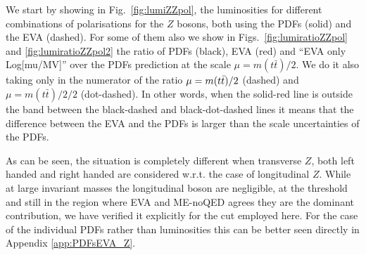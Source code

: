 \documentclass[a4paper,11pt]{article}
\begin{document}
We start by showing in Fig.~\ref{fig:lumiZZpol}, the luminosities for different combinations of polarisations for the $Z$ bosons, both using the PDFs (solid) and the EVA (dashed). For some of them also we show in Figs.~\ref{fig:lumiratioZZpol} and \ref{fig:lumiratioZZpol2} the ratio of PDFs (black), EVA (red) and ``EVA only Log[mu/MV]'' over the PDFs prediction at the scale $\mu=m(t \bar t) /2$. We do it also taking only in the numerator of the ratio  $\mu=m(t \bar t) /2 \time 2$ (dashed) and $\mu=m(t \bar t) /2 / 2$ (dot-dashed). In other words, when the solid-red line is outside the band between the black-dashed and black-dot-dashed lines it means that the difference between the EVA and the PDFs is larger than the scale uncertainties of the PDFs.

As can be seen, the situation is completely different when transverse $Z$, both left handed and right handed  are considered w.r.t. the case of longitudinal $Z$. While at large invariant masses the longitudinal boson are negligible, at the threshold and still in the region where EVA and ME-noQED agrees they are the dominant contribution, we have verified it explicitly for the cut employed here. For the case of the individual PDFs rather than luminosities this can be better seen directly in Appendix \ref{app:PDFsEVA_Z}.





 




%
\end{document}
